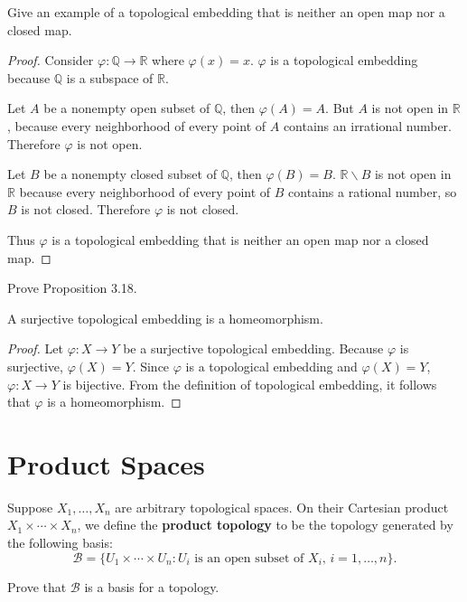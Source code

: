 \begin{exercise}{3.17}
	Give an example of a topological embedding that is neither an open map nor a closed map.
\end{exercise}

\begin{proof}
	Consider $\varphi: \mathbb{Q}\to \mathbb{R}$ where $\varphi(x) = x$. $\varphi$ is a topological embedding because $\mathbb{Q}$ is a subspace of $\mathbb{R}$.

	Let $A$ be a nonempty open subset of $\mathbb{Q}$, then $\varphi(A) = A$. But $A$ is not open in $\mathbb{R}$, because every neighborhood of every point of $A$ contains an irrational number. Therefore $\varphi$ is not open.

	Let $B$ be a nonempty closed subset of $\mathbb{Q}$, then $\varphi(B) = B$. $\mathbb{R}\smallsetminus B$ is not open in $\mathbb{R}$ because every neighborhood of every point of $B$ contains a rational number, so $B$ is not closed. Therefore $\varphi$ is not closed.

	Thus $\varphi$ is a topological embedding that is neither an open map nor a closed map.
\end{proof}

\begin{exercise}{3.19}
	Prove Proposition 3.18.

	A surjective topological embedding is a homeomorphism.
\end{exercise}

\begin{proof}
	Let $\varphi: X\to Y$ be a surjective topological embedding. Because $\varphi$ is surjective, $\varphi(X) = Y$. Since $\varphi$ is a topological embedding and $\varphi(X) = Y$, $\varphi: X\to Y$ is bijective. From the definition of topological embedding, it follows that $\varphi$ is a homeomorphism.
\end{proof}

\section*{Product Spaces}

\begin{exercise}{3.25}
	Suppose $X_{1}, \ldots, X_{n}$ are arbitrary topological spaces. On their Cartesian product $X_{1}\times \cdots \times X_{n}$, we define the \textbf{product topology} to be the topology generated by the following basis:
	\[
		\mathscr{B} = \{ U_{1} \times \cdots \times U_{n}: \text{$U_{i}$ is an open subset of $X_{i}$, $i = 1,\ldots,n $}  \}.
	\]

	Prove that $\mathscr{B}$ is a basis for a topology.
\end{exercise}

